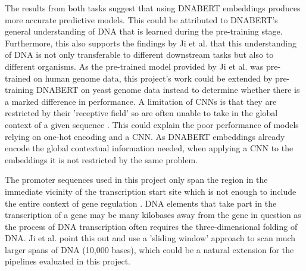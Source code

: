 \documentclass{article}
\begin{document}
The results from both tasks suggest that using DNABERT embeddings produces more accurate predictive models. This could be attributed to DNABERT's general understanding of DNA that is learned during the pre-training stage. Furthermore, this also supports the findings by Ji et al. \cite{dnabert2020} that this understanding of DNA is not only transferable to different downstream tasks but also to different organisms. As the pre-trained model provided by Ji et al. \cite{dnabert2020} was pre-trained on human genome data, this project's work could be extended by pre-training DNABERT on yeast genome data instead to determine whether there is a marked difference in performance. A limitation of CNNs is that they are restricted by their 'receptive field' so are often unable to take in the global context of a given sequence \cite{dnabert2020,LeCun2015}. This could explain the poor performance of models relying on one-hot encoding and a CNN. As DNABERT embeddings already encode the global contextual information needed, when applying a CNN to the embeddings it is not restricted by the same problem.

The promoter sequences used in this project only span the region in the immediate vicinity of the transcription start site which is not enough to include the entire context of gene regulation \cite{Gibcus2012}. DNA elements that take part in the transcription of a gene may be many kilobases away from the gene in question as the process of DNA transcription often requires the three-dimensional folding of DNA. Ji et al. \cite{dnabert2020} point this out and use a 'sliding window' approach to scan much larger spans of DNA (10,000 bases), which could be a natural extension for the pipelines evaluated in this project.

\newpage

\printbibliography
\end{document}
